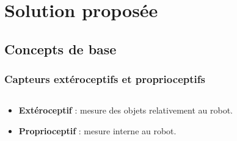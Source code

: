 \section{Solution proposée}

\subsection{Concepts de base}
    \begin{frame}
        \frametitle{Capteurs extéroceptifs et proprioceptifs}
        \begin{columns}[c]                
            \begin{column}{0.65\textwidth}
                \begin{itemize}
                    \item \textbf{Extéroceptif} : mesure des objets relativement au robot.\vspace{6 mm}
                    \item \textbf{Proprioceptif} : mesure interne au robot.
                \end{itemize}                         
            \end{column} 
                            

\end{columns}
\end{frame}
